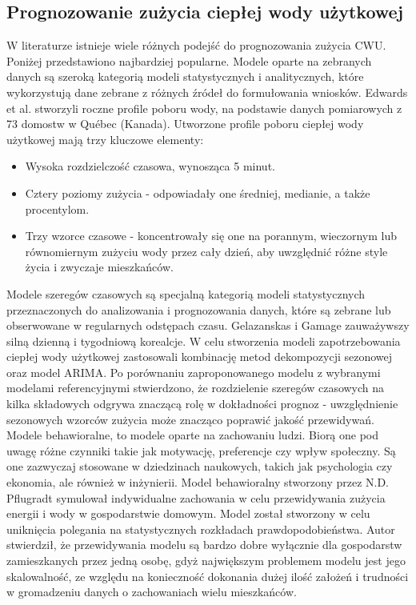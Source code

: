 \documentclass[a4paper,twoside,12pt]{book}
\begin{document}
\subsection{Prognozowanie zużycia ciepłej wody użytkowej}
W literaturze istnieje wiele różnych podejść do prognozowania zużycia CWU. Poniżej przedstawiono najbardziej popularne. Modele oparte na zebranych danych są szeroką kategorią modeli statystycznych i analitycznych, które wykorzystują dane zebrane z różnych źródeł do formułowania wniosków. Edwards et al.\cite{bib:data_model} stworzyli roczne profile poboru wody, na podstawie danych pomiarowych z 73 domostw w Québec (Kanada). Utworzone profile poboru ciepłej wody użytkowej mają trzy kluczowe elementy:
\begin{itemize}
  \item Wysoka rozdzielczość czasowa, wynosząca 5 minut.
  \item Cztery poziomy zużycia - odpowiadały  one średniej, medianie, a także procentylom.
  \item Trzy wzorce czasowe - koncentrowały się one na porannym, wieczornym lub równomiernym zużyciu wody przez cały dzień, aby uwzględnić różne style życia i zwyczaje mieszkańców.
\end{itemize}

Modele szeregów czasowych są specjalną kategorią modeli statystycznych przeznaczonych do analizowania i prognozowania danych, które są zebrane lub obserwowane w regularnych odstępach czasu. Gelazanskas i Gamage\cite{bib:Time_series} zauważywszy silną dzienną i tygodniową korealcje. W celu stworzenia modeli zapotrzebowania ciepłej wody użytkowej zastosowali kombinację metod dekompozycji sezonowej oraz model ARIMA. Po porównaniu  zaproponowanego modelu z wybranymi modelami referencyjnymi stwierdzono, że rozdzielenie szeregów czasowych na kilka składowych odgrywa znaczącą rolę w dokładności prognoz - uwzględnienie sezonowych wzorców zużycia może znacząco poprawić jakość przewidywań.\\

Modele behawioralne, to modele oparte na zachowaniu ludzi. Biorą one pod uwagę różne czynniki takie jak motywację, preferencje czy wpływ społeczny. Są one zazwyczaj stosowane w dziedzinach naukowych, takich jak psychologia czy ekonomia, ale również w inżynierii. Model behawioralny stworzony przez N.D. Pflugradt\cite{bib:Behavioural} symulował indywidualne zachowania w celu przewidywania zużycia energii i wody w gospodarstwie domowym. Model został stworzony w celu uniknięcia polegania na statystycznych rozkładach prawdopodobieństwa. Autor stwierdził, że przewidywania modelu są bardzo dobre wyłącznie dla gospodarstw zamieszkanych przez jedną osobę, gdyż największym problemem modelu jest jego skalowalność, ze względu na konieczność dokonania dużej ilość założeń i trudności w gromadzeniu danych o zachowaniach wielu mieszkańców.\\
\end{document}
